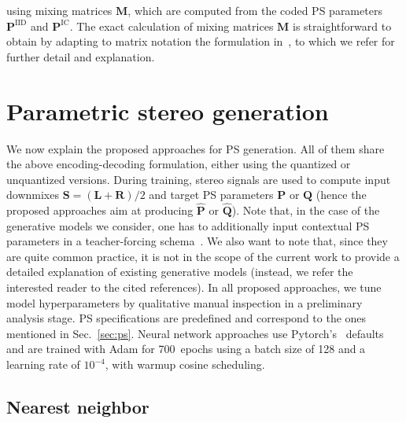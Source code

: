 \documentclass{article}
\newcommand{\ma}[1]{\textbf{#1}}
\begin{document}
using mixing matrices $\ma{M}$, which are computed from the coded PS parameters $\ma{P}^{\text{IID}}$ and $\ma{P}^{\text{IC}}$. The exact calculation of mixing matrices $\ma{M}$ is straightforward to obtain by adapting to matrix notation the formulation in~\cite{Breebaart2005}, to which we refer for further detail and explanation.


\section{Parametric stereo generation}
\label{sec:psgen}

We now explain the proposed approaches for PS generation. All of them share the above encoding-decoding formulation, either using the quantized or unquantized versions. During training, stereo signals are used to compute input downmixes $\ma{S}=(\ma{L}+\ma{R})/2$ and target PS parameters $\ma{P}$ or $\ma{Q}$ (hence the proposed approaches aim at producing $\hat{\ma{P}}$ or $\hat{\ma{Q}}$). Note that, in the case of the generative models we consider, one has to additionally input contextual PS parameters in a teacher-forcing schema~\cite{Williams_1989}. We also want to note that, since they are quite common practice, it is not in the scope of the current work to provide a detailed explanation of existing generative models (instead, we refer the interested reader to the cited references). In all proposed approaches, we tune model hyperparameters by qualitative manual inspection in a preliminary analysis stage. PS specifications are predefined and correspond to the ones mentioned in Sec.~\ref{sec:ps}. Neural network approaches use Pytorch's~\cite{Paszke_2019} defaults and are trained with Adam for 700~epochs using a batch size of 128 and a learning rate of $10^{-4}$, with warmup cosine scheduling. 

\subsection{Nearest neighbor}
\label{sec:nneigh}
\end{document}
